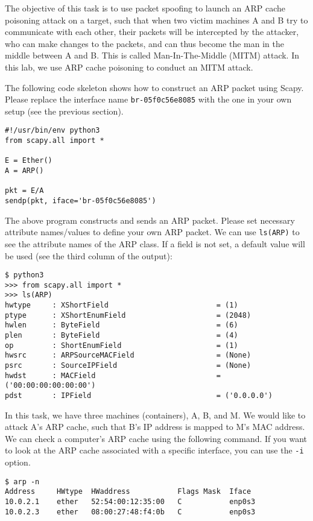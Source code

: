 The objective of this task is to use packet spoofing to launch an ARP cache poisoning attack on
a target, such that when two victim machines A and B try to communicate with each other, their
packets will be intercepted by the attacker, who can make changes to the packets, and can thus
become the man in the middle between A and B. This is called Man-In-The-Middle (MITM) attack.
In this lab, we use ARP cache poisoning to conduct an MITM attack. 



The following code skeleton shows how to construct an ARP packet using Scapy. 
Please replace the interface name \texttt{br-05f0c56e8085} with the one in your 
own setup (see the previous section). 

\begin{lstlisting}
#!/usr/bin/env python3
from scapy.all import *

E = Ether()
A = ARP()

pkt = E/A
sendp(pkt, iface='br-05f0c56e8085')
\end{lstlisting}

The above program constructs and sends an ARP packet. Please set necessary attribute
names/values to define your own ARP packet. We can use \texttt{ls(ARP)} to see the attribute
names of the ARP class. If a field is not set, a default value will be used (see the third
column of the output):

\begin{lstlisting}
$ python3
>>> from scapy.all import *
>>> ls(ARP)
hwtype     : XShortField                         = (1)
ptype      : XShortEnumField                     = (2048)
hwlen      : ByteField                           = (6)
plen       : ByteField                           = (4)
op         : ShortEnumField                      = (1)
hwsrc      : ARPSourceMACField                   = (None)
psrc       : SourceIPField                       = (None)
hwdst      : MACField                            = ('00:00:00:00:00:00')
pdst       : IPField                             = ('0.0.0.0')
\end{lstlisting}

In this task, we have three machines (containers), A, B, and M. 
We would like to attack A's ARP cache, such that
B's IP address is mapped to M's MAC address. We can check
a computer's ARP cache using the following command. If you 
want to look at the ARP cache associated with a specific
interface, you can use the \texttt{-i} option. 

\begin{lstlisting}
$ arp -n
Address     HWtype  HWaddress           Flags Mask  Iface
10.0.2.1    ether   52:54:00:12:35:00   C           enp0s3
10.0.2.3    ether   08:00:27:48:f4:0b   C           enp0s3
\end{lstlisting}

